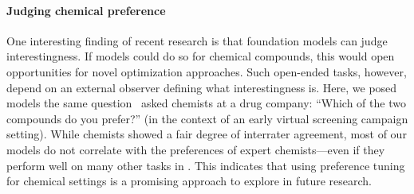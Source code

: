 \documentclass[11pt, oneside]{article}
\begin{document}
\begin{refsection}


\paragraph{Judging chemical preference}

One interesting finding of recent research is that foundation models can judge interestingness.\autocite{zhang2024omniopenendednessmodelshuman}
If models could do so for chemical compounds, this would open opportunities for novel optimization approaches. 
Such open-ended tasks, however, depend on an external observer defining what interestingness is.\autocite{hughes2024openendednessessentialartificialsuperhuman}
Here, we posed models the same question~\textcite{Choung_2023} asked chemists at a drug company: \enquote{Which of the two compounds do you prefer?} (in the context of an early virtual screening campaign setting).
While chemists showed a fair degree of interrater agreement, most of our models do not correlate with the preferences of expert chemists---even if they perform well on many other tasks in \chembench.
This indicates that using preference tuning for chemical settings is a promising approach to explore in future research.



\end{refsection}
\end{document}
